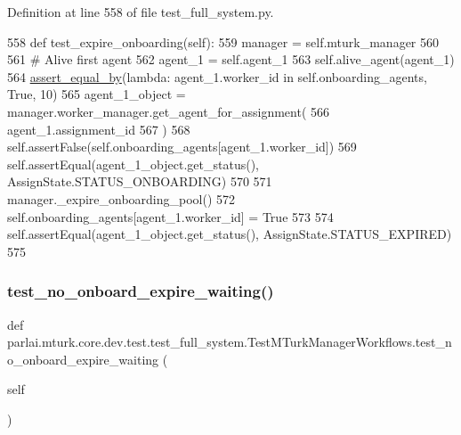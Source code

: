 Definition at line 558 of file test\+\_\+full\+\_\+system.\+py.


\begin{DoxyCode}
558     \textcolor{keyword}{def }test\_expire\_onboarding(self):
559         manager = self.mturk\_manager
560 
561         \textcolor{comment}{# Alive first agent}
562         agent\_1 = self.agent\_1
563         self.alive\_agent(agent\_1)
564         \hyperlink{namespaceparlai_1_1mturk_1_1core_1_1test_1_1test__full__system_a0b463246d35658a2e422010f13dcf819}{assert\_equal\_by}(\textcolor{keyword}{lambda}: agent\_1.worker\_id \textcolor{keywordflow}{in} self.onboarding\_agents, \textcolor{keyword}{True}, 10)
565         agent\_1\_object = manager.worker\_manager.get\_agent\_for\_assignment(
566             agent\_1.assignment\_id
567         )
568         self.assertFalse(self.onboarding\_agents[agent\_1.worker\_id])
569         self.assertEqual(agent\_1\_object.get\_status(), AssignState.STATUS\_ONBOARDING)
570 
571         manager.\_expire\_onboarding\_pool()
572         self.onboarding\_agents[agent\_1.worker\_id] = \textcolor{keyword}{True}
573 
574         self.assertEqual(agent\_1\_object.get\_status(), AssignState.STATUS\_EXPIRED)
575 
\end{DoxyCode}
\mbox{\label{classparlai_1_1mturk_1_1core_1_1dev_1_1test_1_1test__full__system_1_1TestMTurkManagerWorkflows_aea7f86b35f032a0f71f92b6e1a207a61}} 
\subsubsection{\texorpdfstring{test\+\_\+no\+\_\+onboard\+\_\+expire\+\_\+waiting()}{test\_no\_onboard\_expire\_waiting()}}
{\footnotesize\ttfamily def parlai.\+mturk.\+core.\+dev.\+test.\+test\+\_\+full\+\_\+system.\+Test\+M\+Turk\+Manager\+Workflows.\+test\+\_\+no\+\_\+onboard\+\_\+expire\+\_\+waiting (\begin{DoxyParamCaption}\item[{}]{self }\end{DoxyParamCaption})}




